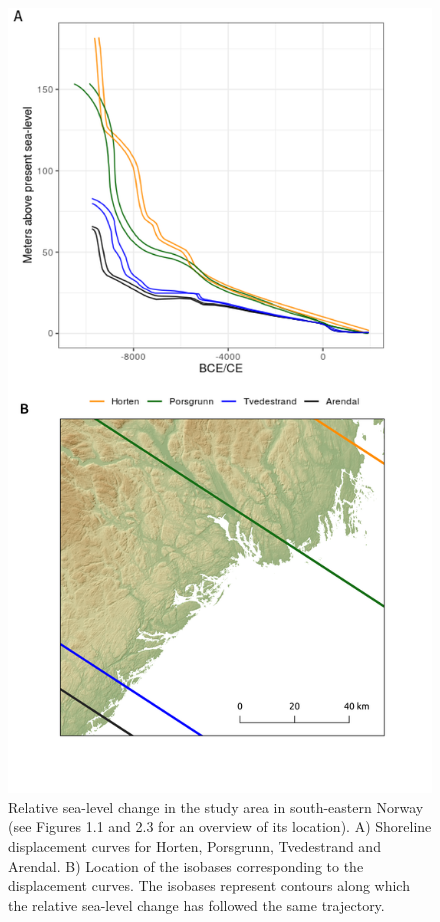 \documentclass[
  12pt,
  a4paper,
  oneside]{book}
\begin{document}
\begin{figure}

{\centering \includegraphics[width=0.95\linewidth]{figures/study_rsl} 

}

\caption{Relative sea-level change in the study area in south-eastern Norway (see Figures 1.1 and 2.3 for an overview of its location). A) Shoreline displacement curves for Horten, Porsgrunn, Tvedestrand and Arendal. B) Location of the isobases corresponding to the displacement curves. The isobases represent contours along which the relative sea-level change has followed the same trajectory.}\label{fig:study-rsl}
\end{figure}
\end{document}
